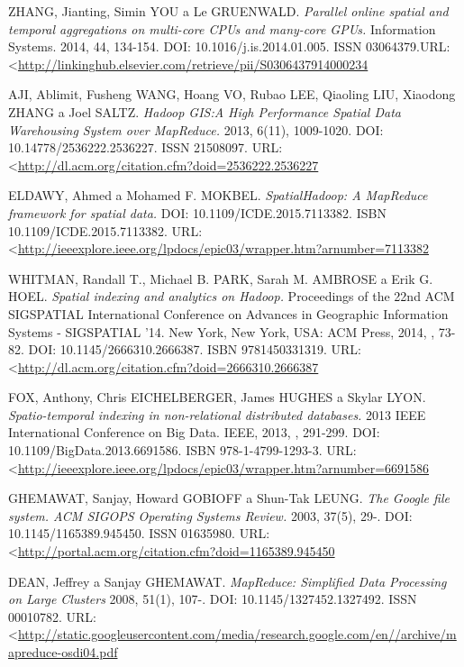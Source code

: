 \documentclass[a4paper,12pt,oneside]{report}
\begin{document}
\begin{thebibliography}{99}
		ZHANG, Jianting, Simin YOU a Le GRUENWALD. \textit{Parallel online spatial and
			temporal aggregations on multi-core CPUs and many-core GPUs.} Information
		Systems. 2014, 44, 134-154. DOI: 10.1016/j.is.2014.01.005. ISSN 03064379.URL: 
		\textless\url{http://linkinghub.elsevier.com/retrieve/pii/S0306437914000234}
		
		
		AJI, Ablimit, Fusheng WANG, Hoang VO, Rubao LEE, Qiaoling LIU, Xiaodong ZHANG a
		Joel SALTZ. \textit{Hadoop GIS:A High Performance Spatial Data Warehousing
			System over MapReduce.} 2013, 6(11), 1009-1020. DOI: 10.14778/2536222.2536227.
		ISSN 21508097.  URL: 
		\textless\url{http://dl.acm.org/citation.cfm?doid=2536222.2536227}
		
		ELDAWY, Ahmed a Mohamed F. MOKBEL. \textit{SpatialHadoop: A MapReduce framework
			for spatial data.} DOI: 10.1109/ICDE.2015.7113382. ISBN
		10.1109/ICDE.2015.7113382. URL: 
		\textless\url{http://ieeexplore.ieee.org/lpdocs/epic03/wrapper.htm?arnumber=7113382}
		
		WHITMAN, Randall T., Michael B. PARK, Sarah M. AMBROSE a Erik G. HOEL.
		\textit{Spatial indexing and analytics on Hadoop.} Proceedings of the 22nd ACM
		SIGSPATIAL International Conference on Advances in Geographic Information
		Systems - SIGSPATIAL '14. New York, New York, USA: ACM Press, 2014, , 73-82.
		DOI: 10.1145/2666310.2666387. ISBN 9781450331319. URL: 
		\textless\url{http://dl.acm.org/citation.cfm?doid=2666310.2666387}
		
		FOX, Anthony, Chris EICHELBERGER, James HUGHES a Skylar LYON.
		\textit{Spatio-temporal indexing in non-relational distributed databases.} 2013
		IEEE International Conference on Big Data. IEEE, 2013, , 291-299. DOI:
		10.1109/BigData.2013.6691586. ISBN 978-1-4799-1293-3. URL: 
		\textless\url{http://ieeexplore.ieee.org/lpdocs/epic03/wrapper.htm?arnumber=6691586}
		
		GHEMAWAT, Sanjay, Howard GOBIOFF a Shun-Tak LEUNG. \textit{The Google file
			system. ACM SIGOPS Operating Systems Review.} 2003, 37(5), 29-. DOI:
		10.1145/1165389.945450. ISSN 01635980.  URL: 
		\textless\url{http://portal.acm.org/citation.cfm?doid=1165389.945450}
		
		DEAN, Jeffrey a Sanjay GHEMAWAT. \textit{MapReduce: Simplified Data Processing
			on Large Clusters}  2008, 51(1), 107-. DOI: 10.1145/1327452.1327492. ISSN
		00010782. URL: 
		\textless\url{http://static.googleusercontent.com/media/research.google.com/en//archive/mapreduce-osdi04.pdf}
		

\end{thebibliography}
\end{document}
